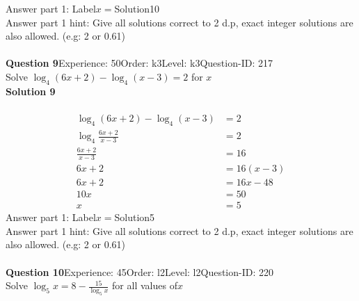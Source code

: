 \documentclass{article}
\begin{document}
Answer part 1: \hspace{10pt}Label\hspace{10pt}$x=$\hspace{10pt}Solution\hspace{10pt}10\\
Answer part 1 hint: \hspace{15pt}Give all solutions correct to 2 d.p, exact integer solutions are also allowed. (e.g: 2 or 0.61)\\
\\[4pt]
\noindent\textbf{Question 9}\hspace{20pt}Experience: 50\hspace{20pt}Order: k3\hspace{20pt}Level: k3\hspace{20pt}Question-ID: 217\\[2pt]
Solve $\log_{4}(6x+2)-\log_{4}(x-3)=2$ for $x$\\[4pt]
\noindent\textbf{Solution 9}\\[2pt]
\\[-35pt]\begin{align*}
\log_{4}(6x+2)-\log_{4}(x-3)&=2\\[2pt]
\log_{4}\displaystyle\frac{6x+2}{x-3}&=2\\[2pt]
\displaystyle\frac{6x+2}{x-3}&=16\\[2pt]
6x+2&=16(x-3)\\[2pt]
6x+2&=16x-48\\[2pt]
10x&=50\\[2pt]
x&=5
\end{align*}
Answer part 1: \hspace{10pt}Label\hspace{10pt}$x=$\hspace{10pt}Solution\hspace{10pt}5\\
Answer part 1 hint: \hspace{15pt}Give all solutions correct to 2 d.p, exact integer solutions are also allowed. (e.g: 2 or 0.61)\\
\\[4pt]
\noindent\textbf{Question 10}\hspace{20pt}Experience: 45\hspace{20pt}Order: l2\hspace{20pt}Level: l2\hspace{20pt}Question-ID: 220\\[2pt]
Solve $\log_{5}x=8-\displaystyle\frac{15}{\log_5{x}}$ for all values of$x$\\[4pt]
\end{document}
